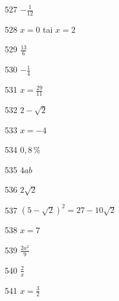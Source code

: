 \begin{Vastaus}{527}
		$-\frac{1}{12}$
	
\end{Vastaus}
\begin{Vastaus}{528}
				$x=0$ tai $x=2$
	
\end{Vastaus}
\begin{Vastaus}{529}
				$\frac{13}{6}$
	
\end{Vastaus}
\begin{Vastaus}{530}
				$-\frac{1}{4}$
	
\end{Vastaus}
\begin{Vastaus}{531}
				$x=\frac{29}{11}$
	
\end{Vastaus}
\begin{Vastaus}{532}
				$2-\sqrt{2}$
	
\end{Vastaus}
\begin{Vastaus}{533}
				$x=-4$
	
\end{Vastaus}
\begin{Vastaus}{534}
	$0,8\,\%$
	
\end{Vastaus}
\begin{Vastaus}{535}
				$4ab$
	
\end{Vastaus}
\begin{Vastaus}{536}
				$2\sqrt{2}$
	
\end{Vastaus}
\begin{Vastaus}{537}
				$(5-\sqrt{2})^2=27-10\sqrt{2}$ %
	
\end{Vastaus}
\begin{Vastaus}{538}
				$x=7$
	
\end{Vastaus}
\begin{Vastaus}{539}
				$\frac{2a^2}{9}$
	
\end{Vastaus}
\begin{Vastaus}{540}
				$\frac{2}{x}$
	
\end{Vastaus}
\begin{Vastaus}{541}
				$x=\frac{3}{2}$
	
\end{Vastaus}
